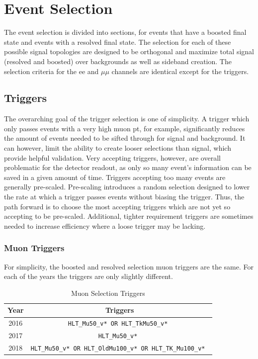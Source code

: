 \chapter{Event Selection}
\label{ch:event_selection}
The event selection is divided into sections, for events that have a boosted final state and events with a resolved final state.
The selection for each of these possible signal topologies are designed to be orthogonal and maximize total signal (resolved and boosted) over backgrounds as well as sideband creation. The selection criteria for the ee and $\mu\mu$ channels are identical except for the triggers.
\section{Triggers}
\label{sec:triggers}
The overarching goal of the trigger selection is one of simplicity.  A trigger which only passes events with a very high muon pt, for example, significantly reduces the amount of events needed to be sifted through for signal and background.  It can however, limit the ability to create looser selections than signal, which provide helpful validation.  Very accepting triggers, however, are overall problematic for the detector readout, as only so many event's information can be saved in a given amount of time.  Triggers accepting too many events are generally pre-scaled.  Pre-scaling introduces a random selection designed to lower the rate at which a trigger passes events without biasing the trigger.  Thus, the path forward is to choose the most accepting triggers which are not yet so accepting to be pre-scaled.  Additional, tighter requirement triggers are sometimes needed to increase efficiency where a loose trigger may be lacking.
\subsection{Muon Triggers}
For simplicity, the boosted and resolved selection muon triggers are the same.  For each of the years the triggers are only slightly different.

\begin{table}[htbp]
  \caption{
    Muon Selection Triggers
  }
  \centering
  \label{tab:MuTrig}
  \begin{tabular}{cc}
\hline
Year & Triggers \\
\hline
2016 & \tt HLT\_Mu50\_v* OR HLT\_TkMu50\_v* \\
2017 & \tt HLT\_Mu50\_v* \\
2018 & \tt HLT\_Mu50\_v* OR HLT\_OldMu100\_v* OR HLT\_TK\_Mu100\_v* \\
\hline
  \end{tabular}
\end{table}

